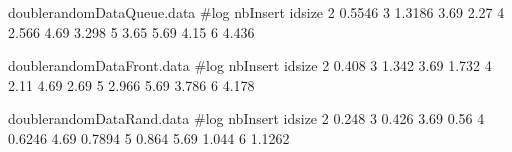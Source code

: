 
\begin{filecontents}{doublerandomDataQueue.data}
#log nbInsert idsize  
2 0.5546
3 1.3186
3.69 2.27
4 2.566
4.69 3.298
5 3.65
5.69 4.15
6 4.436
\end{filecontents}

\begin{filecontents}{doublerandomDataFront.data}
#log nbInsert  idsize  
2 0.408
3 1.342
3.69 1.732
4 2.11
4.69 2.69
5 2.966
5.69 3.786
6 4.178
\end{filecontents}

\begin{filecontents}{doublerandomDataRand.data}
#log nbInsert  idsize  
2 0.248
3 0.426
3.69 0.56
4 0.6246
4.69 0.7894
5 0.864
5.69 1.044
6 1.1262
\end{filecontents}
